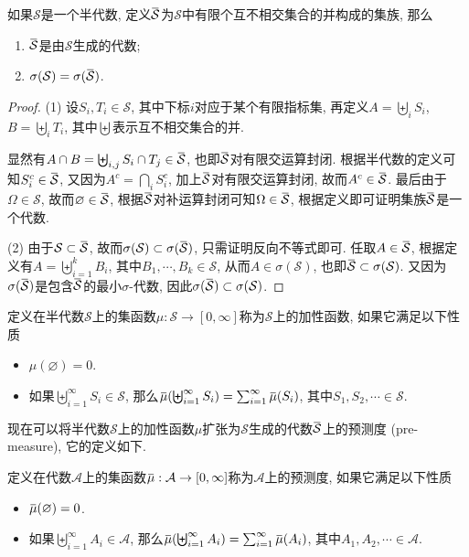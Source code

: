 \documentclass[cn, 12pt, math=mtpro2, bibstyle=apa, blue, twocol]{elegantbook}
\newcommand{\SE}{\mathcal{S}}
\newcommand{\overbar}[1]{\mkern 1.5mu\overline{\mkern-1.5mu#1\mkern-1.5mu}\mkern 1.5mu}
\let\emptyset\varnothing
\begin{document}
\begin{lemma}
如果$\mathcal{S}$是一个半代数, 定义$\overbar{\mathcal{S}}$为$\mathcal{S}$中有限个互不相交集合的并构成的集族, 那么
\begin{enumerate}[label=(\arabic*)]
\item $\overbar{\mathcal{S}}$是由$\mathcal{S}$生成的代数;
\item $\sigma(\SE)=\sigma(\overbar{\SE})$.
\end{enumerate}
\end{lemma}
\begin{proof}
 (1) 设$S_i, T_i\in\mathcal{S}$, 其中下标$i$对应于某个有限指标集, 再定义$A=\biguplus_iS_i$, $B=\biguplus_iT_i$, 其中$\biguplus$表示互不相交集合的并.

  显然有$A\cap B=\biguplus_{i,j}S_i\cap T_j\in\overbar{\mathcal{S}}$, 也即$\overbar{\mathcal{S}}$对有限交运算封闭. 根据半代数的定义可知$S_i^c\in\overbar{\mathcal{S}}$, 又因为$A^c=\bigcap_iS_i^c$, 加上$\overbar{\mathcal{S}}$对有限交运算封闭, 故而$A^c\in\overbar{\mathcal{S}}$. 最后由于$\Omega\in\mathcal{S}$, 故而$\emptyset\in\overbar{\mathcal{S}}$, 根据$\overbar{\mathcal{S}}$对补运算封闭可知$\Omega\in\overbar{\mathcal{S}}$, 根据定义即可证明集族$\overbar{\SE}$是一个代数.

  (2) 由于$\SE\subset\overbar{\SE}$, 故而$\sigma(\SE)\subset\sigma(\overbar{\SE})$, 只需证明反向不等式即可. 任取$A\in\overbar{\SE}$, 根据定义有$A=\biguplus_{i=1}^kB_i$, 其中$B_1,\cdots,B_k\in\SE$, 从而$A\in\sigma(\SE)$, 也即$\overbar{\SE}\subset\sigma(\SE)$. 又因为$\sigma(\overbar{\SE})$是包含$\overbar{\SE}$的最小$\sigma$-代数, 因此$\sigma(\overbar{\SE})\subset\sigma(\SE)$.
\end{proof}

\begin{definition}
定义在半代数$\SE$上的集函数$\mu:\SE\to[0,\infty]$称为$\SE$上的加性函数, 如果它满足以下性质
\begin{itemize}
  \item $\mu(\emptyset)=0$.
  \item 如果$\biguplus_{i=1}^\infty S_i\in\mathcal{S}$, 那么$\overbar{\mu}(\biguplus_{i=1}^\infty S_i)=\sum_{i=1}^{\infty}\overbar{\mu}(S_i)$, 其中$S_1,S_2,\cdots\in\SE$.
\end{itemize}
\end{definition}


现在可以将半代数$\SE$上的加性函数$\mu$扩张为$\SE$生成的代数$\overbar{\SE}$上的预测度 (pre-measure), 它的定义如下.
\begin{definition}
定义在代数$\mathcal{A}$上的集函数$\overbar{\mu}:\mathcal{A}\to[0,\infty]$称为$\mathcal{A}$上的预测度, 如果它满足以下性质
\begin{itemize}
  \item $\overbar{\mu}(\emptyset)=0$.
  \item 如果$\biguplus_{i=1}^\infty A_i\in\mathcal{A}$, 那么$\overbar{\mu}(\biguplus_{i=1}^\infty A_i)=\sum_{i=1}^{\infty}\overbar{\mu}(A_i)$, 其中$A_1,A_2,\cdots\in\mathcal{A}$.
\end{itemize}
\end{definition}
\end{document}
